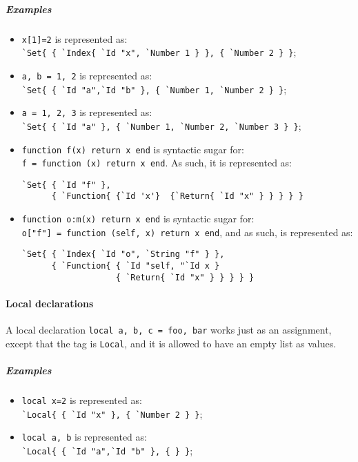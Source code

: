 \subparagraph{Examples}
\begin{itemize}

\item \verb+x[1]=2+ is represented as:\\
  \verb+`Set{ { `Index{ `Id "x", `Number 1 } }, { `Number 2 } }+;

\item \verb+a, b = 1, 2+ is represented as:\\
  \verb+`Set{ { `Id "a",`Id "b" }, { `Number 1, `Number 2 } }+;

\item \verb+a = 1, 2, 3+ is represented as:\\
  \verb+`Set{ { `Id "a" }, { `Number 1, `Number 2, `Number 3 } }+;

\item \verb+function f(x) return x end+ is syntactic sugar for:\\
  \verb+f = function (x) return x end+. As such, it is represented as:\\[-2em]
\begin{verbatim}
`Set{ { `Id "f" },
      { `Function{ {`Id 'x'}  {`Return{ `Id "x" } } } } }
\end{verbatim}

\item \verb+function o:m(x) return x end+ is syntactic sugar for:\\
  \verb+o["f"] = function (self, x) return x end+, and as such, is
  represented as:\\[-2em]
\begin{verbatim}
`Set{ { `Index{ `Id "o", `String "f" } },
      { `Function{ { `Id "self, "`Id x }
                   { `Return{ `Id "x" } } } } }
\end{verbatim}

\end{itemize}

\paragraph{Local declarations}
A local declaration \verb+local a, b, c = foo, bar+ works just as an
assignment, except that the tag is \verb+Local+, and it is allowed to
have an empty list as values.

\subparagraph{Examples}
\begin{itemize}

\item \verb+local x=2+ is represented as:\\
  \verb+`Local{ { `Id "x" }, { `Number 2 } }+;

\item \verb+local a, b+ is represented as:\\
  \verb+`Local{ { `Id "a",`Id "b" }, { } }+;

\end{itemize}

